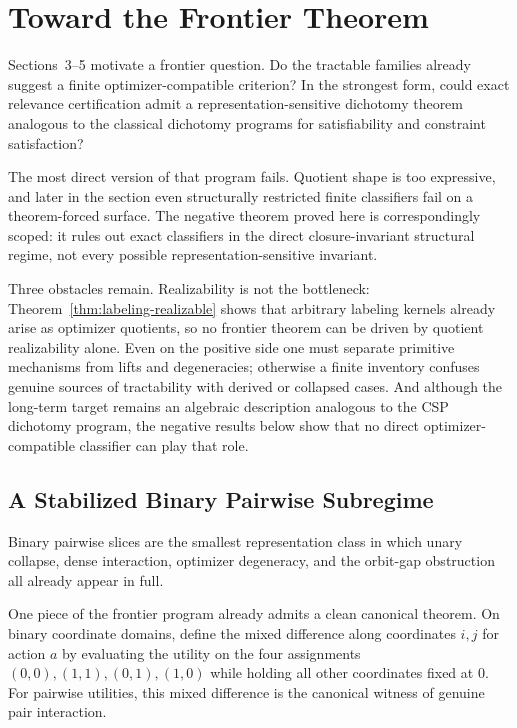 \section{Toward the Frontier Theorem}\label{sec:frontier-program}

Sections~3--5 motivate a frontier question. Do the tractable families already suggest a finite optimizer-compatible criterion? In the strongest form, could exact relevance certification admit a representation-sensitive dichotomy theorem analogous to the classical dichotomy programs for satisfiability and constraint satisfaction?

The most direct version of that program fails. Quotient shape is too expressive, and later in the section even structurally restricted finite classifiers fail on a theorem-forced surface. The negative theorem proved here is correspondingly scoped: it rules out exact classifiers in the direct closure-invariant structural regime, not every possible representation-sensitive invariant.

Three obstacles remain. Realizability is not the bottleneck: Theorem~\ref{thm:labeling-realizable} shows that arbitrary labeling kernels already arise as optimizer quotients, so no frontier theorem can be driven by quotient realizability alone. Even on the positive side one must separate primitive mechanisms from lifts and degeneracies; otherwise a finite inventory confuses genuine sources of tractability with derived or collapsed cases. And although the long-term target remains an algebraic description analogous to the CSP dichotomy program, the negative results below show that no direct optimizer-compatible classifier can play that role.

\subsection*{A Stabilized Binary Pairwise Subregime}

Binary pairwise slices are the smallest representation class in which unary collapse, dense interaction, optimizer degeneracy, and the orbit-gap obstruction all already appear in full.

One piece of the frontier program already admits a clean canonical theorem. On binary coordinate domains, define the mixed difference along coordinates $i,j$ for action $a$ by evaluating the utility on the four assignments $(0,0),(1,1),(0,1),(1,0)$ while holding all other coordinates fixed at $0$. For pairwise utilities, this mixed difference is the canonical witness of genuine pair interaction.

